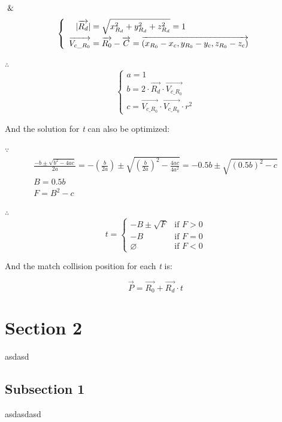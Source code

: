 $\And$
\[
\left\{
\begin{array}{lr}
\begin{aligned}
\lvert \overrightarrow{R_{d}} \rvert &= \sqrt{x_{R_{d}}^2 + y_{R_{d}}^2 + z_{R_{d}}^2} = 1 \\
\overrightarrow{V_{c\_R_{0}}} &= \overrightarrow{R_{0}} - \overrightarrow{C} = \overrightarrow{(x_{R_{0}} - x_{c}, y_{R_{0}} - y_{c}, z_{R_{0}} - z_{c})}
\end{aligned}
\end{array}
\right.
\]

$\therefore$
\[
\left\{
\begin{array}{lr}
a =1 \\
b = 2 \cdot \overrightarrow{R_{d}} \cdot \overrightarrow{V_{c\_R_{0}}} \\
c = \overrightarrow{V_{c\_R_{0}}} \cdot \overrightarrow{V_{c\_R_{0}}} \cdot r^2
\end{array}
\right.
\]

And the solution for \emph{t} can also be optimized:

$\because$
\[
\begin{array}{lr}
\frac{-b \pm \sqrt{b^2 - 4ac}}{2a} = -(\frac{b}{2a}) \pm \sqrt{(\frac{b}{2a})^2 - \frac{4ac}{4a^2}} = -0.5b \pm \sqrt{(0.5b)^2 - c} \\
B = 0.5b\\
F = B^2 - c
\end{array}
\]

$\therefore$
\[
t =
\begin{cases}
 -B \pm \sqrt{F} & \text{if } F > 0 \\
-B & \text{if } F = 0 \\
\varnothing & \text{if } F < 0
\end{cases}
\]

And the match collision position for each \emph{t} is:

\begin{equation}\label{equ:ray-sphere-intersection}
\overrightarrow{P} = \overrightarrow{R_{0}} + \overrightarrow{R_{d}} \cdot t
\end{equation}


\section{Section 2}
asdasd

\subsection{Subsection 1}
asdasdasd


